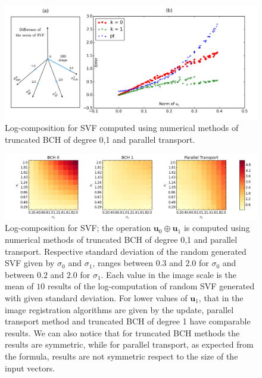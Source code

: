 \begin{figure}[!ht]
	\hspace{-1.5cm}
	\includegraphics[scale=0.6]{figures/SVF_bch_parallel_transport.png}
	\caption{Log-composition for SVF computed using numerical methods of truncated BCH of degree 0,1 and parallel transport.}
	\label{fig:SVF_bch_parallel_transport}
\end{figure}


\begin{figure}[!ht]
	\hspace{-2.1cm}
	\includegraphics[scale=0.53]{figures/SVF_image_scale.png}
	\caption{Log-composition for SVF; the operation $\mathbf{u}_0\oplus \mathbf{u}_1$ is computed using numerical methods of truncated BCH of degree 0,1 and parallel transport. Respective standard deviation of the random generated SVF given by $\sigma_0$ and $\sigma_1$, ranges between $0.3$ and $2.0$ for $\sigma_0$ and between $0.2$ and $2.0$ for $\sigma_1$. Each value in the image scale is the mean of $10$ results of the log-computation of random SVF generated with given standard deviation. For lower values of $\mathbf{u}_1$, that in the image registration algorithms are given by the update, parallel transport method and truncated BCH of degree 1 have comparable results. We can also notice that for truncated BCH methods the results are symmetric, while for parallel transport, as expected from the formula, results are not symmetric respect to the size of the input vectors. }
	\label{fig:SVF_image_scale}
\end{figure}


